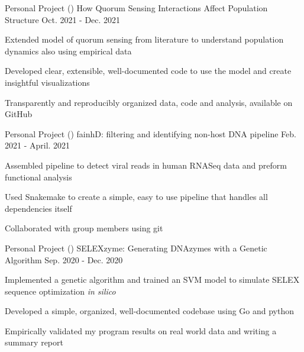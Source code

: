 \begin{cventries}
\vspace{-0.05in}
\cventry
{Personal Project ()}
{How Quorum Sensing Interactions Affect Population Structure}
{Oct. 2021 - Dec. 2021}
{}
{
\begin{cvitems}
    \item{Extended model of quorum sensing from literature to understand population dynamics also using empirical data}
    \item{Developed clear, extensible, well-documented code to use the model and create insightful visualizations}
    \item{Transparently and reproducibly organized data, code and analysis, available on GitHub}
\end{cvitems}
}
\cventry
{Personal Project ()}
{fainhD: filtering and identifying non-host DNA pipeline}
{Feb. 2021 - April. 2021}
{}
{
\begin{cvitems}
    \item{Assembled pipeline to detect viral reads in human RNASeq data and preform functional analysis}
    \item{Used Snakemake to create a simple, easy to use pipeline that handles all dependencies itself}
    \item{Collaborated with group members using git}
\end{cvitems}
}
\cventry
{Personal Project ()}
{SELEXzyme: Generating DNAzymes with a Genetic Algorithm}
{Sep. 2020 - Dec. 2020}
{}
{
\begin{cvitems}
    \item{Implemented a genetic algorithm and trained an SVM model to simulate SELEX sequence optimization \textit{in silico}}
    \item{Developed a simple, organized, well-documented codebase using Go and python}
    \item{Empirically validated my program results on real world data and writing a summary report}

\end{cvitems}}
\end{cventries}
